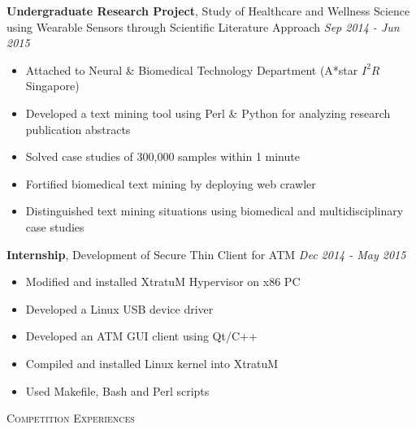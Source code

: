 \documentclass[a4paper, 12pt]{article}
\newenvironment{changemargin}[2]{%
  \begin{list}{}{%
      \setlength{\topsep}{0pt}%
      \setlength{\leftmargin}{#1}%
      \setlength{\rightmargin}{#2}%
      \setlength{\listparindent}{\parindent}%
      \setlength{\itemindent}{\parindent}%
      \setlength{\parsep}{\parskip}%
    }%
  \item[]}{\end{list}
}
\newcommand{\lineover}{
  \begin{changemargin}{-0.05in}{-0.05in}
    \vspace*{-8pt}
    \hrulefill \\
    \vspace*{-2pt}
  \end{changemargin}
}
\newcommand{\header}[1]{
  \begin{changemargin}{-0.6in}{-0.6in}
    \fontsize{15}{15}\scshape{#1}\\
    \lineover
    \vspace*{-4pt}
  \end{changemargin}
}
\newenvironment{body}
{
\vspace*{-16pt}
\begin{changemargin}{-0.25in}{-0.5in}
}
{
\end{changemargin}
}
\begin{document}
\begin{body}
  \textbf{Undergraduate Research Project}, {Study of Healthcare and Wellness Science using Wearable Sensors through Scientific Literature Approach} \hfill \emph{Sep 2014 - Jun 2015}\\
  \vspace*{-6pt}
  \begin{itemize} \itemsep -0pt  \small
  \item Attached to Neural \& Biomedical Technology Department (A*star $I^{2}R$ Singapore)
  \item Developed a text mining tool using Perl \& Python for analyzing research publication abstracts
  \item Solved case studies of 300,000 samples within 1 minute
  \item Fortified biomedical text mining by deploying web crawler
  \item Distinguished text mining situations using biomedical and multidisciplinary case studies
  \end{itemize}

  \textbf{Internship}, {Development of Secure Thin Client for ATM} \hfill \emph{Dec 2014 - May 2015}\\
  \vspace*{-6pt}
  \begin{itemize} \itemsep -0pt  \small
  \item Modified and installed XtratuM Hypervisor on x86 PC
  \item Developed a Linux USB device driver
  \item Developed an ATM GUI client using Qt/C++
  \item Compiled and installed Linux kernel into XtratuM
  \item Used Makefile, Bash and Perl scripts
  \end{itemize}
\end{body}

\header{Competition Experiences}
\end{document}
